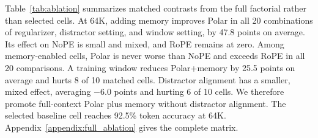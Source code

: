\documentclass{article}
\begin{document}
Table~\ref{tab:ablation} summarizes matched contrasts from the full factorial rather than selected cells. At 64K, adding memory improves Polar in all 20 combinations of regularizer, distractor setting, and window setting, by 47.8 points on average. Its effect on NoPE is small and mixed, and RoPE remains at zero. Among memory-enabled cells, Polar is never worse than NoPE and exceeds RoPE in all 20 comparisons. A training window reduces Polar+memory by 25.5 points on average and hurts 8 of 10 matched cells. Distractor alignment has a smaller, mixed effect, averaging $-6.0$ points and hurting 6 of 10 cells. We therefore promote full-context Polar plus memory without distractor alignment. The selected baseline cell reaches 92.5\% token accuracy at 64K. Appendix~\ref{appendix:full_ablation} gives the complete matrix.

\begin{table}[t]
\centering
\small
\setlength{\tabcolsep}{3.4pt}
\caption{Matched contrasts across the 120-cell, 1B-token factorial. Values are percentage-point changes in teacher-forced five-token accuracy at 64K. Each row holds all other factorial axes fixed. ``Positive'' excludes one numerical tie in the Polar--NoPE comparison.}
\label{tab:ablation}
\end{table}
\end{document}
